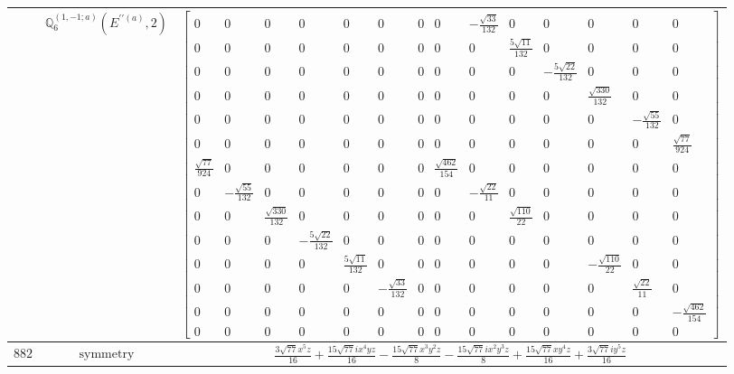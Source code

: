 \documentclass[fleqn,8pt,landscape]{jsarticle}
\begin{document}
\begin{longtable}{ccc}
$  $ & $ \mathbb{Q}_{6}^{(1,-1;a)}(E^{\prime\prime(a)},2) $ & $ \begin{bmatrix} 0 & 0 & 0 & 0 & 0 & 0 & 0 & 0 & - \frac{\sqrt{33}}{132} & 0 & 0 & 0 & 0 & 0 \\ 0 & 0 & 0 & 0 & 0 & 0 & 0 & 0 & 0 & \frac{5 \sqrt{11}}{132} & 0 & 0 & 0 & 0 \\ 0 & 0 & 0 & 0 & 0 & 0 & 0 & 0 & 0 & 0 & - \frac{5 \sqrt{22}}{132} & 0 & 0 & 0 \\ 0 & 0 & 0 & 0 & 0 & 0 & 0 & 0 & 0 & 0 & 0 & \frac{\sqrt{330}}{132} & 0 & 0 \\ 0 & 0 & 0 & 0 & 0 & 0 & 0 & 0 & 0 & 0 & 0 & 0 & - \frac{\sqrt{55}}{132} & 0 \\ 0 & 0 & 0 & 0 & 0 & 0 & 0 & 0 & 0 & 0 & 0 & 0 & 0 & \frac{\sqrt{77}}{924} \\ \frac{\sqrt{77}}{924} & 0 & 0 & 0 & 0 & 0 & 0 & \frac{\sqrt{462}}{154} & 0 & 0 & 0 & 0 & 0 & 0 \\ 0 & - \frac{\sqrt{55}}{132} & 0 & 0 & 0 & 0 & 0 & 0 & - \frac{\sqrt{22}}{11} & 0 & 0 & 0 & 0 & 0 \\ 0 & 0 & \frac{\sqrt{330}}{132} & 0 & 0 & 0 & 0 & 0 & 0 & \frac{\sqrt{110}}{22} & 0 & 0 & 0 & 0 \\ 0 & 0 & 0 & - \frac{5 \sqrt{22}}{132} & 0 & 0 & 0 & 0 & 0 & 0 & 0 & 0 & 0 & 0 \\ 0 & 0 & 0 & 0 & \frac{5 \sqrt{11}}{132} & 0 & 0 & 0 & 0 & 0 & 0 & - \frac{\sqrt{110}}{22} & 0 & 0 \\ 0 & 0 & 0 & 0 & 0 & - \frac{\sqrt{33}}{132} & 0 & 0 & 0 & 0 & 0 & 0 & \frac{\sqrt{22}}{11} & 0 \\ 0 & 0 & 0 & 0 & 0 & 0 & 0 & 0 & 0 & 0 & 0 & 0 & 0 & - \frac{\sqrt{462}}{154} \\ 0 & 0 & 0 & 0 & 0 & 0 & 0 & 0 & 0 & 0 & 0 & 0 & 0 & 0 \end{bmatrix} $ \\ \hline
$ 882 $ & $ \text{symmetry} $ & $ \frac{3 \sqrt{77} x^{5} z}{16} + \frac{15 \sqrt{77} i x^{4} y z}{16} - \frac{15 \sqrt{77} x^{3} y^{2} z}{8} - \frac{15 \sqrt{77} i x^{2} y^{3} z}{8} + \frac{15 \sqrt{77} x y^{4} z}{16} + \frac{3 \sqrt{77} i y^{5} z}{16} $ \\

\end{longtable}
\end{document}
